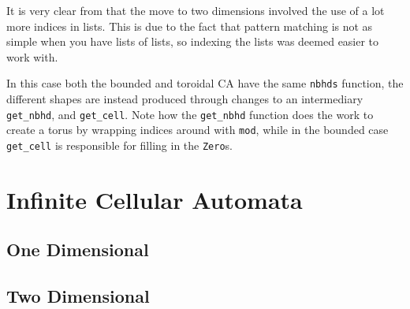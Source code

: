 It is very clear from  that the move to two dimensions involved the use of a lot more indices in lists.
This is due to the fact that pattern matching is not as simple when you have lists of lists,
so indexing the lists was deemed easier to work with.

In this case both the bounded and toroidal CA have the same \texttt{nbhds} function,
the different shapes are instead produced through changes to an intermediary \texttt{get_nbhd}, 
and \texttt{get_cell}.
Note how the \texttt{get_nbhd} function does the work to create a torus by wrapping indices around with \texttt{mod},
while in the bounded case \texttt{get_cell} is responsible for filling in the \texttt{Zero}s.

\section{Infinite Cellular Automata}

\subsection{One Dimensional}

\subsection{Two Dimensional}
